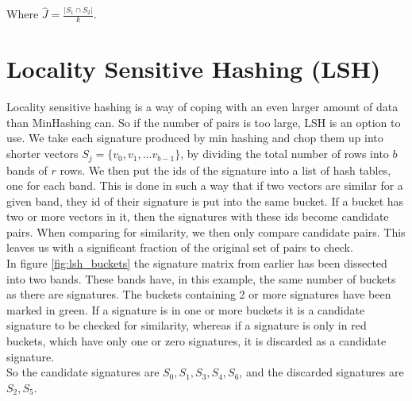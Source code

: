 \documentclass[a4paper,11pt]{article}
\begin{document}
Where $\hat{J} = \frac{|S_1 \cap S_2|}{k}$.

\section{Locality Sensitive Hashing (LSH)}
Locality sensitive hashing is a way of coping with an even larger amount of data than MinHashing can. So if the number of pairs is too large, LSH is an option to use. We take each signature produced by min hashing and chop them up into shorter vectors $S_j = \{v_0, v_1, \ldots v_{b-1}\}$, by dividing the total number of rows into $b$ bands of $r$ rows. We then put the ids of the signature into a list of hash tables, one for each band. This is done in such a way that if two vectors are similar for a given band, they id of their signature is put into the same bucket. If a bucket has two or more vectors in it, then the signatures with these ids become candidate pairs. When comparing for similarity, we then only compare candidate pairs. This leaves us with a significant fraction of the original set of pairs to check. \\

In figure \ref{fig:lsh_buckets} the signature matrix from earlier has been dissected into two bands. These bands have, in this example, the same number of buckets as there are signatures. The buckets containing 2 or more signatures have been marked in green. If a signature is in one or more buckets it is a candidate signature to be checked for similarity, whereas if a signature is only in red buckets, which have only one or zero signatures, it is discarded as a candidate signature. \\

So the candidate signatures are $S_0, S_1, S_3, S_4, S_6$, and the discarded signatures are $S_2, S_5$.
\end{document}
